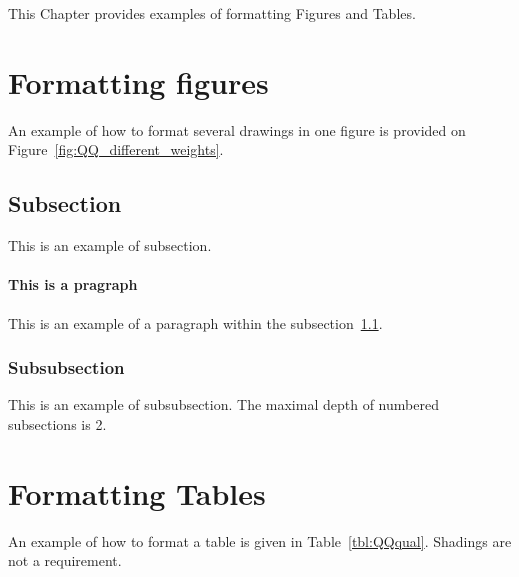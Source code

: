 		


This Chapter provides examples of formatting Figures and Tables. 

\section{Formatting figures}
An example of how to format several drawings in one figure is provided on Figure~\ref{fig:QQ_different_weights}.


\subsection{Subsection}
\label{sec:subsection}
This is an example of subsection.

\paragraph{This is a pragraph}
This is an example of a paragraph within the subsection~\ref{sec:subsection}.

\subsubsection{Subsubsection}
This is an example of subsubsection. The maximal depth of numbered subsections is 2.

\section{Formatting Tables}
An example of how to format a table is given in Table~\ref{tbl:QQqual}. Shadings are not a requirement.


